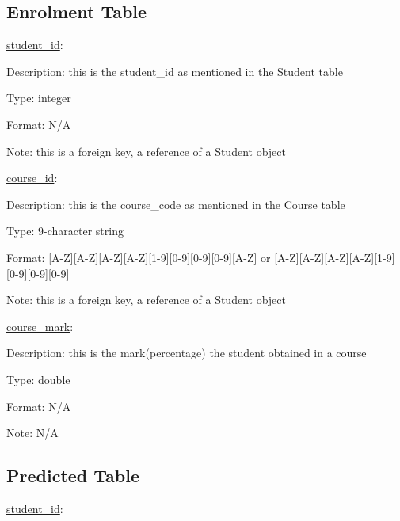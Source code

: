\documentclass[10pt]{article}
\begin{document}
\subsection{Enrolment Table}

\underline{student\_id}:

\begin{description}[font=$\bullet$~\normalfont\scshape\color{red!50!black}]

\item [] Description: this is the student\_id as mentioned in the Student table
\item [] Type: integer
\item [] Format: N/A
\item [] Note: this is a foreign key, a reference of a Student object
\end{description}
\underline{course\_id}:

\begin{description}[font=$\bullet$~\normalfont\scshape\color{red!50!black}]

\item [] Description: this is the course\_code as mentioned in the Course table
\item [] Type: 9-character string
\item [] Format: [A-Z][A-Z][A-Z][A-Z][1-9][0-9][0-9][0-9][A-Z] or  [A-Z][A-Z][A-Z][A-Z][1-9][0-9][0-9][0-9]
\item [] Note: this is a foreign key, a reference of a Student object

\end{description}
\underline{course\_mark}:

\begin{description}[font=$\bullet$~\normalfont\scshape\color{red!50!black}]

\item [] Description: this is the mark(percentage) the student obtained in a course
\item [] Type:  double
\item [] Format: N/A
\item [] Note: N/A

\end{description}

\subsection{Predicted Table}

\underline{student\_id}:
\end{document}
